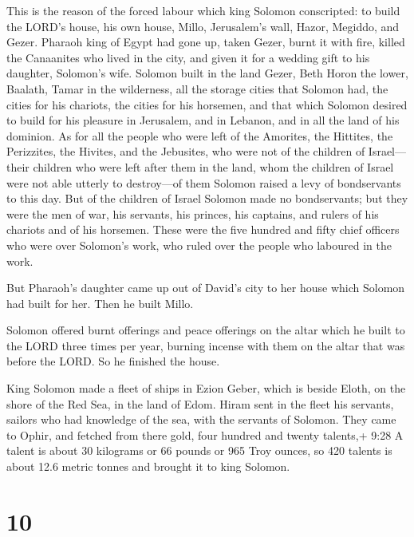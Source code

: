  This is the reason of the forced labour which king Solomon
conscripted: to build the LORD's house, his own house, Millo,
Jerusalem's wall, Hazor, Megiddo, and Gezer.  Pharaoh king
of Egypt had gone up, taken Gezer, burnt it with fire, killed the
Canaanites who lived in the city, and given it for a wedding gift to his
daughter, Solomon's wife.  Solomon built in the land Gezer,
Beth Horon the lower,  Baalath, Tamar in the wilderness,
 all the storage cities that Solomon had, the cities for
his chariots, the cities for his horsemen, and that which Solomon
desired to build for his pleasure in Jerusalem, and in Lebanon, and in
all the land of his dominion.  As for all the people who
were left of the Amorites, the Hittites, the Perizzites, the Hivites,
and the Jebusites, who were not of the children of Israel---
 their children who were left after them in the land, whom
the children of Israel were not able utterly to destroy---of them
Solomon raised a levy of bondservants to this day.  But of
the children of Israel Solomon made no bondservants; but they were the
men of war, his servants, his princes, his captains, and rulers of his
chariots and of his horsemen.  These were the five hundred
and fifty chief officers who were over Solomon's work, who ruled over
the people who laboured in the work.

 But Pharaoh's daughter came up out of David's city to her
house which Solomon had built for her. Then he built Millo.

 Solomon offered burnt offerings and peace offerings on the
altar which he built to the LORD three times per year, burning incense
with them on the altar that was before the LORD. So he finished the
house.

 King Solomon made a fleet of ships in Ezion Geber, which
is beside Eloth, on the shore of the Red Sea, in the land of Edom.
 Hiram sent in the fleet his servants, sailors who had
knowledge of the sea, with the servants of Solomon.  They
came to Ophir, and fetched from there gold, four hundred and twenty
talents,+ 9:28 A talent is about 30 kilograms or 66 pounds or 965 Troy
ounces, so 420 talents is about 12.6 metric tonnes and brought it to
king Solomon.

\hypertarget{section-9}{%
\section{10}\label{section-9}}

